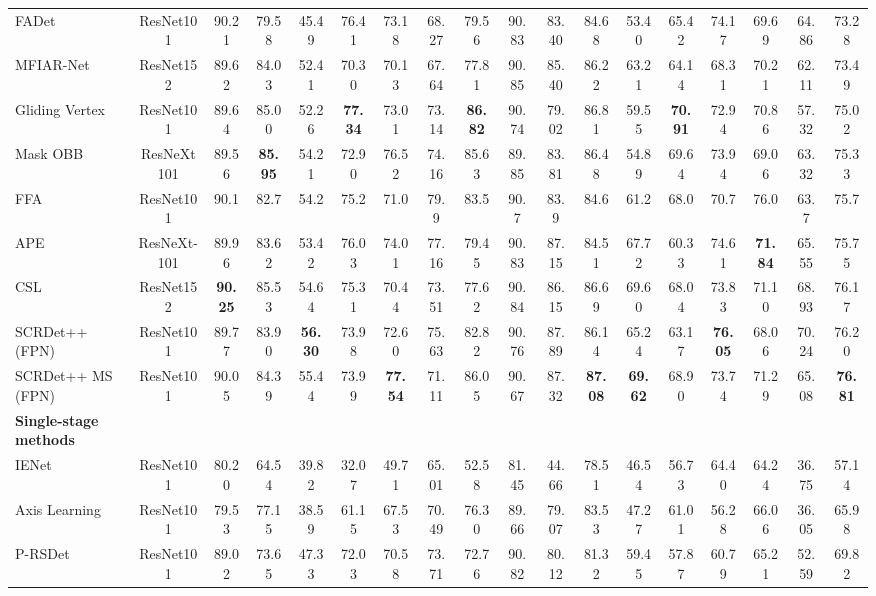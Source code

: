 \documentclass[10pt,journal,compsoc]{IEEEtran}
\begin{document}
\begin{table*}
{\begin{tabular}{l|c|c|c|c|c|c|c|c|c|c|c|c|c|c|c|c|c}
			FADet \cite{li2019feature} & ResNet101 & 90.21 & 79.58 & 45.49 & 76.41 & 73.18 & 68.27 & 79.56 & 90.83 & 83.40 & 84.68 & 53.40 & 65.42 & 74.17 & 69.69 & 64.86 & 73.28\\
			MFIAR-Net \cite{yang2020multi} & ResNet152 \cite{he2016deep} & 89.62 & 84.03 & 52.41 & 70.30 & 70.13 & 67.64 & 77.81 & 90.85 & 85.40 & 86.22 & 63.21 & 64.14 & 68.31 & 70.21 & 62.11 & 73.49 \\
			Gliding Vertex \cite{xu2020gliding} & ResNet101 & 89.64 & 85.00 & 52.26 & \textbf{77.34} & 73.01 & 73.14 & \textbf{86.82} & 90.74 & 79.02 & 86.81 & 59.55 & \textbf{70.91} & 72.94 & 70.86 & 57.32 & 75.02 \\
			Mask OBB \cite{wang2019mask} & ResNeXt101 & 89.56 & \textbf{85.95} & 54.21 & 72.90 & 76.52 & 74.16 & 85.63 & 89.85 & 83.81 & 86.48 & 54.89 & 69.64 & 73.94 & 69.06 & 63.32 & 75.33 \\
			FFA \cite{fu2020rotation} & ResNet101 & 90.1 & 82.7 & 54.2 & 75.2 & 71.0 & 79.9 & 83.5 & 90.7 & 83.9 & 84.6 & 61.2 & 68.0 & 70.7 & 76.0 & 63.7 & 75.7 \\
			APE \cite{zhu2020adaptive} & ResNeXt-101 & 89.96 & 83.62 & 53.42 & 76.03 & 74.01 & 77.16 & 79.45 & 90.83 & 87.15 & 84.51 & 67.72 & 60.33 & 74.61 & \textbf{71.84} & 65.55 & 75.75 \\
			CSL \cite{yang2020arbitrary} & ResNet152 & \textbf{90.25} & 85.53 & 54.64 & 75.31 & 70.44 & 73.51 & 77.62 & 90.84 & 86.15 & 86.69 & 69.60 & 68.04 & 73.83 & 71.10 & 68.93 & 76.17\\
			SCRDet++ (FPN) & ResNet101 & 89.77 & 83.90 & \textbf{56.30} & 73.98 & 72.60 & 75.63 & 82.82 & 90.76 & 87.89 & 86.14 & 65.24 & 63.17 & \textbf{76.05} & 68.06 & 70.24 & 76.20 \\
			SCRDet++ MS (FPN) & ResNet101 & 90.05 & 84.39 & 55.44 & 73.99 & \textbf{77.54} & 71.11 & 86.05 & 90.67 & 87.32 & \textbf{87.08} & \textbf{69.62} & 68.90 & 73.74 & 71.29 & 65.08 & \textbf{76.81} \\
\hline
			\textbf{Single-stage methods} & \multicolumn{16}{|c}{} \\
			\hline
			IENet \cite{lin2019ienet} & ResNet101 & 80.20 & 64.54 & 39.82 & 32.07 & 49.71 & 65.01 & 52.58 & 81.45 & 44.66 & 78.51 & 46.54 & 56.73 & 64.40 & 64.24 & 36.75 & 57.14 \\
			Axis Learning \cite{xiao2020axis} & ResNet101 & 79.53 & 77.15 & 38.59 & 61.15 & 67.53 & 70.49 & 76.30 & 89.66 & 79.07 & 83.53 & 47.27 & 61.01 & 56.28 & 66.06 & 36.05 & 65.98\\
			P-RSDet \cite{zhou2020arbitrary} & ResNet101 & 89.02 & 73.65 & 47.33 & 72.03 & 70.58 & 73.71 & 72.76 & 90.82 & 80.12 & 81.32 & 59.45 & 57.87 & 60.79 & 65.21 & 52.59 & 69.82 \\

\end{tabular}}
\end{table*}
\end{document}
